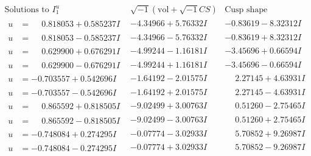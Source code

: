 \documentclass[1p]{elsarticle_modified}
\theoremstyle{definition}
\newcommand{\I}{\sqrt{-1}}
\begin{document}
$$\begin{array}{c|c|c}  
\text{Solutions to }I^u_{1}& \I (\text{vol} + \sqrt{-1}CS) & \text{Cusp shape}\\
 \hline 
\begin{aligned}
u &= \phantom{-}0.818053 + 0.585237 I\end{aligned}
 & -4.34966 + 5.76332 I & -0.83619 - 8.32312 I \\ \hline\begin{aligned}
u &= \phantom{-}0.818053 - 0.585237 I\end{aligned}
 & -4.34966 - 5.76332 I & -0.83619 + 8.32312 I \\ \hline\begin{aligned}
u &= \phantom{-}0.629900 + 0.676291 I\end{aligned}
 & -4.99244 - 1.16181 I & -3.45696 + 0.66594 I \\ \hline\begin{aligned}
u &= \phantom{-}0.629900 - 0.676291 I\end{aligned}
 & -4.99244 + 1.16181 I & -3.45696 - 0.66594 I \\ \hline\begin{aligned}
u &= -0.703557 + 0.542696 I\end{aligned}
 & -1.64192 - 2.01575 I & \phantom{-}2.27145 + 4.63931 I \\ \hline\begin{aligned}
u &= -0.703557 - 0.542696 I\end{aligned}
 & -1.64192 + 2.01575 I & \phantom{-}2.27145 - 4.63931 I \\ \hline\begin{aligned}
u &= \phantom{-}0.865592 + 0.818505 I\end{aligned}
 & -9.02499 + 3.00763 I & \phantom{-}0.51260 - 2.75465 I \\ \hline\begin{aligned}
u &= \phantom{-}0.865592 - 0.818505 I\end{aligned}
 & -9.02499 - 3.00763 I & \phantom{-}0.51260 + 2.75465 I \\ \hline\begin{aligned}
u &= -0.748084 + 0.274295 I\end{aligned}
 & -0.07774 - 3.02933 I & \phantom{-}5.70852 + 9.26987 I \\ \hline\begin{aligned}
u &= -0.748084 - 0.274295 I\end{aligned}
 & -0.07774 + 3.02933 I & \phantom{-}5.70852 - 9.26987 I \\ \hline\begin{aligned}

\end{aligned}
\end{array}$$
\end{document}
